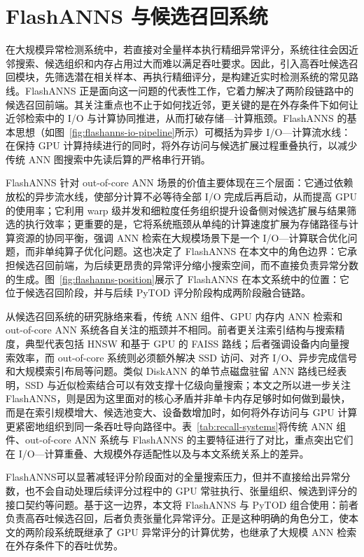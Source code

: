 \section{FlashANNS 与候选召回系统}

在大规模异常检测系统中，若直接对全量样本执行精细异常评分，系统往往会因近邻搜索、候选组织和内存占用过大而难以满足吞吐要求。因此，引入高吞吐候选召回模块，先筛选潜在相关样本、再执行精细评分，是构建近实时检测系统的常见路线。FlashANNS 正是面向这一问题的代表性工作，它着力解决了两阶段链路中的候选召回前端。其关注重点也不止于如何找近邻，更关键的是在外存条件下如何让近邻检索中的 I/O 与计算协同推进，从而打破存储—计算瓶颈\citep{xiao2025flashanns}。FlashANNS 的基本思想（如图~\ref{fig:flashanns-io-pipeline}所示）可概括为异步 I/O---计算流水线：在保持 GPU 计算持续进行的同时，将外存访问与候选扩展过程重叠执行，以减少传统 ANN 图搜索中先读后算的严格串行开销。

FlashANNS 针对 out-of-core ANN 场景的价值主要体现在三个层面：它通过依赖放松的异步流水线，使部分计算不必等待全部 I/O 完成后再启动，从而提高 GPU 的使用率；它利用 warp 级并发和细粒度任务组织提升设备侧对候选扩展与结果筛选的执行效率；更重要的是，它将系统瓶颈从单纯的计算速度扩展为存储路径与计算资源的协同平衡，强调 ANN 检索在大规模场景下是一个 I/O---计算联合优化问题，而非单纯算子优化问题\citep{xiao2025flashanns}。这也决定了 FlashANNS 在本文中的角色边界：它承担候选召回前端，为后续更昂贵的异常评分缩小搜索空间，而不直接负责异常分数的生成。图~\ref{fig:flashanns-position}展示了 FlashANNS 在本文系统中的位置：它位于候选召回阶段，并与后续 PyTOD 评分阶段构成两阶段融合链路。

从候选召回系统的研究脉络来看，传统 ANN 组件、GPU 内存内 ANN 检索和 out-of-core ANN 系统各自关注的瓶颈并不相同。前者更关注索引结构与搜索精度，典型代表包括 HNSW 和基于 GPU 的 FAISS 路线；后者强调设备内向量搜索效率，而 out-of-core 系统则必须额外解决 SSD 访问、对齐 I/O、异步完成信号和大规模索引布局等问题\citep{malkov2020hnsw,johnson2019faiss}。类似 DiskANN 的单节点磁盘驻留 ANN 路线已经表明，SSD 与近似检索结合可以有效支撑十亿级向量搜索；本文之所以进一步关注 FlashANNS，则是因为这里面对的核心矛盾并非单卡内存足够时如何做到最快，而是在索引规模增大、候选池变大、设备数增加时，如何将外存访问与 GPU 计算更紧密地组织到同一条吞吐导向路径中\citep{subramanya2019diskann}。表~\ref{tab:recall-systems}将传统 ANN 组件、out-of-core ANN 系统与 FlashANNS 的主要特征进行了对比，重点突出它们在 I/O---计算重叠、大规模外存适配性以及与本文系统关系上的差异。

FlashANNS可以显著减轻评分阶段面对的全量搜索压力，但并不直接给出异常分数，也不会自动处理后续评分过程中的 GPU 常驻执行、张量组织、候选到评分的接口契约等问题。基于这一边界，本文将 FlashANNS 与 PyTOD 组合使用：前者负责高吞吐候选召回，后者负责张量化异常评分。正是这种明确的角色分工，使本文的两阶段系统既继承了 GPU 异常评分的计算优势，也继承了大规模 ANN 检索在外存条件下的吞吐优势。

